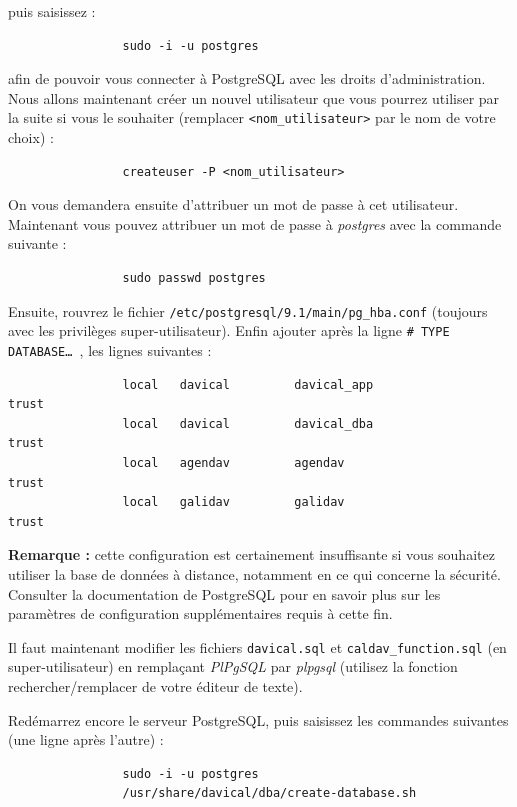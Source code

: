 \documentclass[a4paper, 11pt]{report}
\begin{document}
			puis saisissez :
			\begin{verbatim}
				sudo -i -u postgres
			\end{verbatim}

			afin de pouvoir vous connecter à PostgreSQL avec les droits d’administration. Nous allons maintenant créer un nouvel utilisateur que vous pourrez utiliser par la suite si vous le souhaiter (remplacer \texttt{<nom\_utilisateur>} par le nom de votre choix) :
			\begin{verbatim}
				createuser -P <nom_utilisateur>
			\end{verbatim}

			On vous demandera ensuite d’attribuer un mot de passe à cet utilisateur. Maintenant vous pouvez attribuer un mot de passe à \textit{postgres} avec la commande suivante :
			\begin{verbatim}
				sudo passwd postgres
			\end{verbatim}

			Ensuite, rouvrez le fichier \texttt{/etc/postgresql/9.1/main/pg\_hba.conf} (toujours avec les privilèges super-utilisateur). Enfin ajouter après la ligne \texttt{\og \# TYPE  DATABASE… \fg{}}, les lignes suivantes :
			\begin{verbatim}
				local   davical         davical_app                             trust
				local   davical         davical_dba                             trust
				local   agendav         agendav                                 trust
				local   galidav         galidav                                 trust
			\end{verbatim}

			\textbf{Remarque :} cette configuration est certainement insuffisante si vous souhaitez utiliser la base de données à distance, notamment en ce qui concerne la sécurité. Consulter la documentation de PostgreSQL pour en savoir plus sur les paramètres de configuration supplémentaires requis à cette fin. \newline

			Il faut maintenant modifier les fichiers \texttt{davical.sql} et \texttt{caldav\_function.sql} (en super-utilisateur) en remplaçant \emph{PlPgSQL} par \emph{plpgsql} (utilisez la fonction rechercher/remplacer de votre éditeur de texte).  

			Redémarrez encore le serveur PostgreSQL, puis saisissez les commandes suivantes (une ligne après l’autre) :
			\begin{verbatim}
				sudo -i -u postgres
				/usr/share/davical/dba/create-database.sh
			\end{verbatim}
\end{document}

